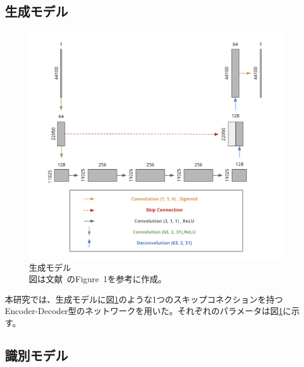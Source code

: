 \subsection{生成モデル}

\begin{figure}[b]
\begin{center}
\includegraphics[width=0.8\hsize]{figure/pr_generator.png}
\caption{生成モデル\\
図は文献~\cite{u-net}のFigure~1を参考に作成。}
\label{fig:pr_gen}
\end{center}
\end{figure}

本研究では、生成モデルに図\ref{fig:pr_gen}のような1つのスキップコネクションを持つEncoder-Decoder型のネットワークを用いた。それぞれのパラメータは図\ref{fig:pr_gen}に示す。

\subsection{識別モデル}

